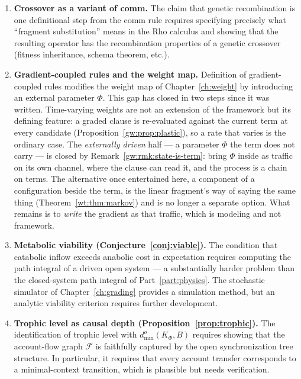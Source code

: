 \begin{enumerate}[label=\textbf{Gap \arabic*.}, leftmargin=*, itemsep=8pt]
  \item \textbf{Crossover as a variant of comm.}
        The claim that genetic recombination is one definitional
        step from the comm rule requires specifying precisely what
        ``fragment substitution'' means in the Rho calculus and
        showing that the resulting operator has the recombination
        properties of a genetic crossover (fitness inheritance,
        schema theorem, etc.).

  \item \textbf{Gradient-coupled rules and the weight map.}
        Definition of gradient-coupled rules modifies the weight
        map of Chapter~\ref{ch:weight} by introducing an external
        parameter $\Phi$.
        This gap has closed in two steps since it was written.
        Time-varying weights are not an extension of the framework
        but its defining feature: a graded clause is re-evaluated
        against the current term at every candidate
        (Proposition~\ref{gw:prop:plastic}), so a rate that varies is
        the ordinary case.
        The \emph{externally driven} half --- a parameter $\Phi$ the
        term does not carry --- is closed by
        Remark~\ref{gw:rmk:state-is-term}: bring $\Phi$ inside as
        traffic on its own channel, where the clause can read it, and
        the process is a chain on terms.  The alternative once
        entertained here, a component of a configuration beside the
        term, is the linear fragment's way of saying the same thing
        (Theorem~\ref{wt:thm:markov}) and is no longer a separate
        option.  What remains is to \emph{write} the gradient as that
        traffic, which is modeling and not framework.

  \item \textbf{Metabolic viability (Conjecture~\ref{conj:viable}).}
        The condition that catabolic inflow exceeds anabolic cost
        in expectation requires computing the path integral of a
        driven open system --- a substantially harder problem than
        the closed-system path integral of Part~\ref{part:physics}.
        The stochastic simulator of Chapter~\ref{ch:grading}
        provides a simulation method, but an analytic viability
        criterion requires further development.

  \item \textbf{Trophic level as causal depth
        (Proposition~\ref{prop:trophic}).}
        The identification of trophic level with
        $d^o_{\min}(K_\Phi, B)$ requires showing that the
        account-flow graph $\mathcal{F}$ is faithfully captured
        by the open synchronization tree structure.
        In particular, it requires that every account transfer
        corresponds to a minimal-context transition, which is
        plausible but needs verification.


\end{enumerate}
